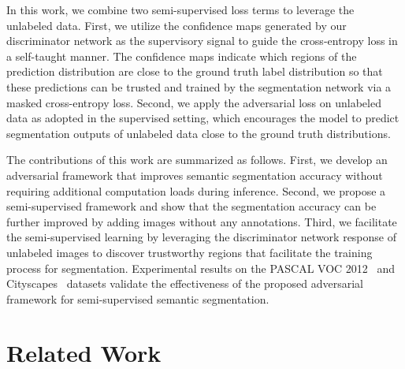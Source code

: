 \documentclass{bmvc2k}
\begin{document}
	In this work, we combine two semi-supervised loss terms to leverage the unlabeled data.
First, we utilize the confidence maps generated by our discriminator network as the supervisory signal to guide the cross-entropy loss in a self-taught manner.
The confidence maps indicate which regions of the prediction distribution are close to the ground truth label distribution so that these predictions can be trusted and trained by the segmentation network via a masked cross-entropy loss.
Second, we apply the adversarial loss on unlabeled data as adopted in the supervised setting, which encourages the model to predict segmentation outputs of unlabeled data close to the ground truth distributions.


	The contributions of this work are summarized as follows. First, we develop an adversarial framework that improves semantic segmentation accuracy without requiring additional computation loads during inference.
Second, we propose a semi-supervised framework and show that the segmentation accuracy can be further improved by adding images without any annotations.
Third, we facilitate the semi-supervised learning by leveraging the discriminator network response of unlabeled images to discover trustworthy regions that facilitate 
	the training process for segmentation.
Experimental results on the PASCAL VOC 2012~\cite{pascal} and Cityscapes~\cite{cityscapes} datasets validate the effectiveness of the proposed adversarial framework for semi-supervised semantic segmentation.
	
	\section{Related Work}
\end{document}
